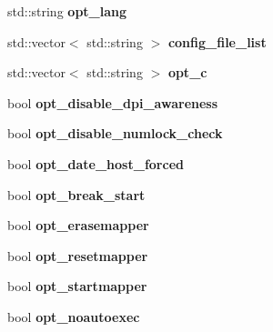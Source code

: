 \begin{DoxyCompactItemize}
\item 
\hypertarget{classConfig_a077860660ed77a40cf5ff1540873d9d6}{std\-::string {\bfseries opt\-\_\-lang}}\label{classConfig_a077860660ed77a40cf5ff1540873d9d6}

\item 
\hypertarget{classConfig_a4842020c7194c3b5c02980c2cd7c59d5}{std\-::vector$<$ std\-::string $>$ {\bfseries config\-\_\-file\-\_\-list}}\label{classConfig_a4842020c7194c3b5c02980c2cd7c59d5}

\item 
\hypertarget{classConfig_ace110896f67f0404622ef497e652ea3b}{std\-::vector$<$ std\-::string $>$ {\bfseries opt\-\_\-c}}\label{classConfig_ace110896f67f0404622ef497e652ea3b}

\item 
\hypertarget{classConfig_a64fd0847634fc174dbd521607116a0c7}{bool {\bfseries opt\-\_\-disable\-\_\-dpi\-\_\-awareness}}\label{classConfig_a64fd0847634fc174dbd521607116a0c7}

\item 
\hypertarget{classConfig_a9265412e49f5228d63c506ceab66a6c2}{bool {\bfseries opt\-\_\-disable\-\_\-numlock\-\_\-check}}\label{classConfig_a9265412e49f5228d63c506ceab66a6c2}

\item 
\hypertarget{classConfig_a84bdd8a5d672f1e15b2ac8f5eca497ff}{bool {\bfseries opt\-\_\-date\-\_\-host\-\_\-forced}}\label{classConfig_a84bdd8a5d672f1e15b2ac8f5eca497ff}

\item 
\hypertarget{classConfig_abbaadb9fcb5ab3065a8728cf271e4bc8}{bool {\bfseries opt\-\_\-break\-\_\-start}}\label{classConfig_abbaadb9fcb5ab3065a8728cf271e4bc8}

\item 
\hypertarget{classConfig_ae4e0136fb9b65400cb317f60e3c1b64d}{bool {\bfseries opt\-\_\-erasemapper}}\label{classConfig_ae4e0136fb9b65400cb317f60e3c1b64d}

\item 
\hypertarget{classConfig_af9f2964b9f782effb00e13a8c33af411}{bool {\bfseries opt\-\_\-resetmapper}}\label{classConfig_af9f2964b9f782effb00e13a8c33af411}

\item 
\hypertarget{classConfig_a20c5b48a8fb54c1ba41be07901dea768}{bool {\bfseries opt\-\_\-startmapper}}\label{classConfig_a20c5b48a8fb54c1ba41be07901dea768}

\item 
\hypertarget{classConfig_ad04bb376e7598e1eff5c4626956b700c}{bool {\bfseries opt\-\_\-noautoexec}}\label{classConfig_ad04bb376e7598e1eff5c4626956b700c}


\end{DoxyCompactItemize}
